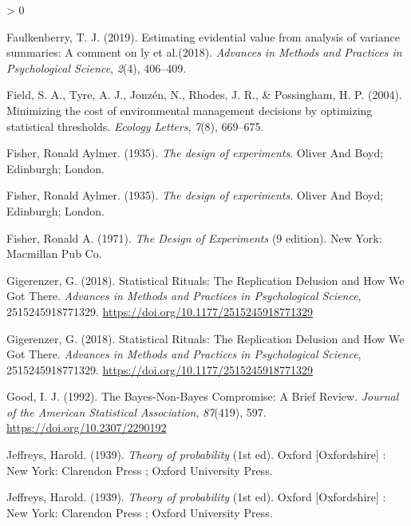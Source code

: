 \documentclass[
  english,
  ,jou, a4paper,floatsintext]{apa6}
\newlength{\cslhangindent}
\newenvironment{CSLReferences}[2] %
 {%
  \setlength{\parindent}{0pt}
  \ifodd #1 \everypar{\setlength{\hangindent}{\cslhangindent}}\ignorespaces\fi
  \ifnum #2 > 0
  \setlength{\parskip}{#2\baselineskip}
  \fi
 }%
 {}
\begin{document}
\begin{CSLReferences}{1}{0}
\leavevmode\hypertarget{ref-faulkenberry2019estimating}{}%
Faulkenberry, T. J. (2019). Estimating evidential value from analysis of variance summaries: A comment on ly et al.(2018). \emph{Advances in Methods and Practices in Psychological Science}, \emph{2}(4), 406--409.

\leavevmode\hypertarget{ref-field_minimizing_2004}{}%
Field, S. A., Tyre, A. J., Jonzén, N., Rhodes, J. R., \& Possingham, H. P. (2004). Minimizing the cost of environmental management decisions by optimizing statistical thresholds. \emph{Ecology Letters}, \emph{7}(8), 669--675.

\leavevmode\hypertarget{ref-fisher_design_1935}{}%
Fisher, Ronald Aylmer. (1935). \emph{The design of experiments}. {Oliver And Boyd; Edinburgh; London}.

\leavevmode\hypertarget{ref-fisher_design_1935}{}%
Fisher, Ronald Aylmer. (1935). \emph{The design of experiments}. {Oliver And Boyd; Edinburgh; London}.

\leavevmode\hypertarget{ref-fisher_design_1971}{}%
Fisher, Ronald A. (1971). \emph{The {Design} of {Experiments}} (9 edition). New York: Macmillan Pub Co.

\leavevmode\hypertarget{ref-gigerenzer_statistical_2018}{}%
Gigerenzer, G. (2018). Statistical {Rituals}: {The Replication Delusion} and {How We Got There}. \emph{Advances in Methods and Practices in Psychological Science}, 2515245918771329. \url{https://doi.org/10.1177/2515245918771329}

\leavevmode\hypertarget{ref-gigerenzer_statistical_2018}{}%
Gigerenzer, G. (2018). Statistical {Rituals}: {The Replication Delusion} and {How We Got There}. \emph{Advances in Methods and Practices in Psychological Science}, 2515245918771329. \url{https://doi.org/10.1177/2515245918771329}

\leavevmode\hypertarget{ref-good_bayes-non-bayes_1992}{}%
Good, I. J. (1992). The {Bayes}-{Non}-{Bayes Compromise}: {A Brief Review}. \emph{Journal of the American Statistical Association}, \emph{87}(419), 597. \url{https://doi.org/10.2307/2290192}

\leavevmode\hypertarget{ref-jeffreys_theory_1939}{}%
Jeffreys, Harold. (1939). \emph{Theory of probability} (1st ed). {Oxford {[}Oxfordshire{]} : New York}: {Clarendon Press ; Oxford University Press}.

\leavevmode\hypertarget{ref-jeffreys_theory_1939}{}%
Jeffreys, Harold. (1939). \emph{Theory of probability} (1st ed). {Oxford {[}Oxfordshire{]} : New York}: {Clarendon Press ; Oxford University Press}.


\end{CSLReferences}
\end{document}
